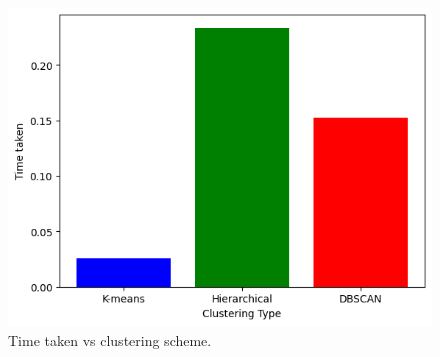 \documentclass[conference]{IEEEtran}
\begin{document}
\begin{figure}[htbp]
\centerline{\includegraphics[trim=10 0 0 0, clip,width=1\columnwidth]{timeVSclustering.png}}
\caption{Time taken vs clustering scheme.}
\label{c2}
\end{figure}
\end{document}
